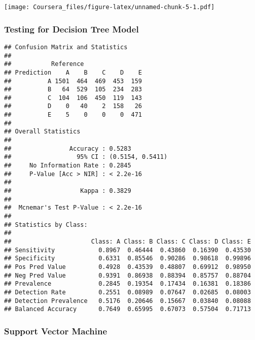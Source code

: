 \documentclass[
]{article}
\newenvironment{Shaded}{\begin{snugshade}}{\end{snugshade}}
\newcommand{\FunctionTok}[1]{\textcolor[rgb]{0.00,0.00,0.00}{#1}}
\newcommand{\NormalTok}[1]{#1}
\newcommand{\OtherTok}[1]{\textcolor[rgb]{0.56,0.35,0.01}{#1}}
\newcommand{\SpecialCharTok}[1]{\textcolor[rgb]{0.00,0.00,0.00}{#1}}
\begin{document}
\texttt{[image: Coursera\_files/figure-latex/unnamed-chunk-5-1.pdf]}

\hypertarget{testing-for-decision-tree-model}{%
\subsubsection{Testing for Decision Tree
Model}\label{testing-for-decision-tree-model}}

\begin{Shaded}
\end{Shaded}

\begin{verbatim}
## Confusion Matrix and Statistics
## 
##           Reference
## Prediction    A    B    C    D    E
##          A 1501  464  469  453  159
##          B   64  529  105  234  283
##          C  104  106  450  119  143
##          D    0   40    2  158   26
##          E    5    0    0    0  471
## 
## Overall Statistics
##                                           
##                Accuracy : 0.5283          
##                  95% CI : (0.5154, 0.5411)
##     No Information Rate : 0.2845          
##     P-Value [Acc > NIR] : < 2.2e-16       
##                                           
##                   Kappa : 0.3829          
##                                           
##  Mcnemar's Test P-Value : < 2.2e-16       
## 
## Statistics by Class:
## 
##                      Class: A Class: B Class: C Class: D Class: E
## Sensitivity            0.8967  0.46444  0.43860  0.16390  0.43530
## Specificity            0.6331  0.85546  0.90286  0.98618  0.99896
## Pos Pred Value         0.4928  0.43539  0.48807  0.69912  0.98950
## Neg Pred Value         0.9391  0.86938  0.88394  0.85757  0.88704
## Prevalence             0.2845  0.19354  0.17434  0.16381  0.18386
## Detection Rate         0.2551  0.08989  0.07647  0.02685  0.08003
## Detection Prevalence   0.5176  0.20646  0.15667  0.03840  0.08088
## Balanced Accuracy      0.7649  0.65995  0.67073  0.57504  0.71713
\end{verbatim}

\hypertarget{support-vector-machine}{%
\subsubsection{Support Vector Machine}\label{support-vector-machine}}
\end{document}
